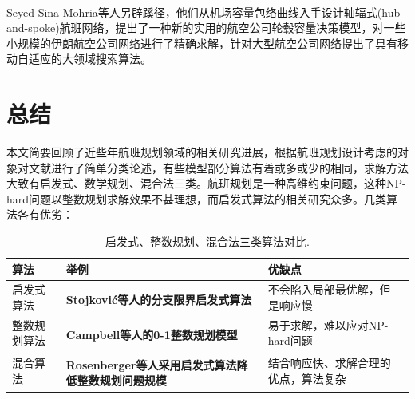 \documentclass[runningheads]{llncs}
\newcommand{\upcite}[1]{\textsuperscript{\textsuperscript{\cite{#1}}}}
\begin{document}
Seyed Sina Mohria等人\upcite{ref_article19}另辟蹊径，他们从机场容量包络曲线入手设计轴辐式(hub-and-spoke)航班网络，提出了一种新的实用的航空公司轮毂容量决策模型，对一些小规模的伊朗航空公司网络进行了精确求解，针对大型航空公司网络提出了具有移动自适应的大领域搜索算法。

\section{总结}
本文简要回顾了近些年航班规划领域的相关研究进展，根据航班规划设计考虑的对象对文献进行了简单分类论述，有些模型部分算法有着或多或少的相同，求解方法大致有启发式、数学规划、混合法三类。航班规划是一种高维约束问题，这种NP-hard问题以整数规划求解效果不甚理想，而启发式算法的相关研究众多。几类算法各有优劣：

\begin{table}
\centering
\begin{tabular}{lp{6cm}p{3cm}p{3cm}}
\hline
算法 &  举例 & 优缺点\\
\hline
启发式算法 &  {\bfseries Stojković等人\upcite{ref_article26}的分支限界启发式算法} & 不会陷入局部最优解，但是响应慢\\
整数规划算法 &  {\bfseries Campbell等人\upcite{ref_article20}的0-1整数规划模型} & 易于求解，难以应对NP-hard问题\\
混合算法 & {\bfseries Rosenberger等人\upcite{ref_article30}采用启发式算法降低整数规划问题规模} & 结合响应快、求解合理的优点，算法复杂\\
\hline
\end{tabular}
\caption{启发式、整数规划、混合法三类算法对比.}\label{tab1}
\end{table}



\end{document}
